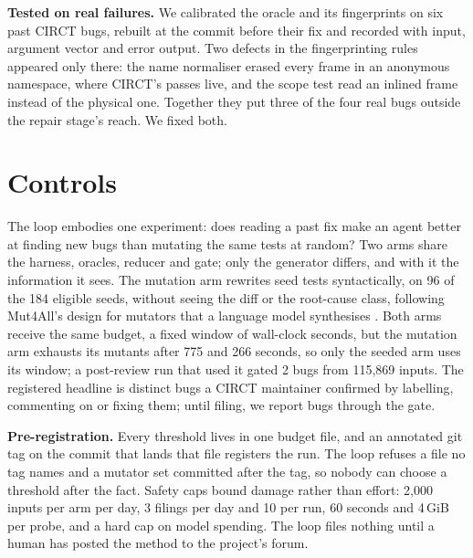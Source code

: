 \documentclass[conference]{IEEEtran}
\begin{document}
\textbf{Tested on real failures.} We calibrated the oracle and its fingerprints
on six past CIRCT bugs, rebuilt at the commit before their fix and recorded with
input, argument vector and error output. %
Two defects in the fingerprinting rules appeared only there: the name normaliser
erased every frame in an anonymous namespace, where CIRCT's passes live, and
the scope test read an inlined frame instead of the physical one. Together they
put three of the four real bugs outside the repair stage's reach. We fixed both. %

\section{Controls}\label{sec:eval}
The loop embodies one experiment: does reading a past fix make an agent better
at finding new bugs than mutating the same tests at random? Two arms share the
harness, oracles, reducer and gate; only the generator differs, and with it the
information it sees. The mutation arm rewrites seed tests syntactically, on 96
of the 184 eligible seeds, without seeing the diff or the root-cause class, following Mut4All's design for mutators that a language model
synthesises \cite{mut4all}.
Both arms receive the same budget, a fixed window of wall-clock seconds, but
the mutation arm exhausts its mutants after 775 and 266 seconds, so only the
seeded arm uses its window; a post-review run that used it gated 2 bugs from
115,869 inputs. The registered headline is distinct bugs a CIRCT
maintainer confirmed by labelling, commenting on or fixing them; until filing,
we report bugs through the gate.

\textbf{Pre-registration.} Every threshold lives in one budget file, and an
annotated git tag on the commit that lands that file registers the run. The
loop refuses a file no tag names and a mutator set committed after the tag, so
nobody can choose a threshold after the fact. %
Safety caps bound damage rather than effort: 2,000 inputs per arm per day, 3
filings per day and 10 per run, 60 seconds and 4\,GiB per probe, and a hard cap
on model spending. %
The loop files nothing until a human has posted the method to the project's
forum. %
\end{document}
